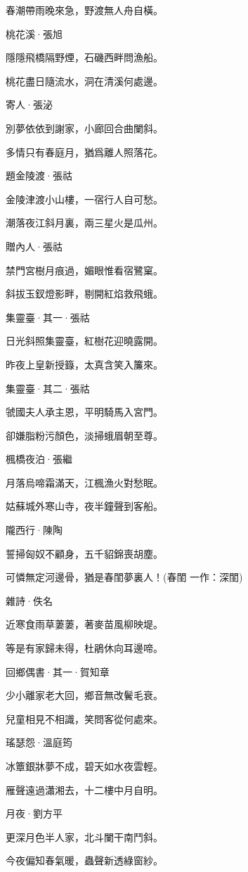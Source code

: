 \documentclass[12pt,a4paper]{ctexbook}
\begin{document}
春潮帶雨晚來急，野渡無人舟自橫。\par
桃花溪·張旭\par
隱隱飛橋隔野煙，石磯西畔問漁船。\par
桃花盡日隨流水，洞在清溪何處邊。\par
寄人·張泌\par
別夢依依到謝家，小廊回合曲闌斜。\par
多情只有春庭月，猶爲離人照落花。\par
題金陵渡·張祜\par
金陵津渡小山樓，一宿行人自可愁。\par
潮落夜江斜月裏，兩三星火是瓜州。\par
贈內人·張祜\par
禁門宮樹月痕過，媚眼惟看宿鷺窠。\par
斜拔玉釵燈影畔，剔開紅焰救飛蛾。\par
集靈臺·其一·張祜\par
日光斜照集靈臺，紅樹花迎曉露開。\par
昨夜上皇新授籙，太真含笑入簾來。\par
集靈臺·其二·張祜\par
虢國夫人承主恩，平明騎馬入宮門。\par
卻嫌脂粉污顏色，淡掃蛾眉朝至尊。\par
楓橋夜泊·張繼\par
月落烏啼霜滿天，江楓漁火對愁眠。\par
姑蘇城外寒山寺，夜半鐘聲到客船。\par
隴西行·陳陶\par
誓掃匈奴不顧身，五千貂錦喪胡塵。\par
可憐無定河邊骨，猶是春閨夢裏人！(春閨 一作：深閨)\par
雜詩·佚名\par
近寒食雨草萋萋，著麥苗風柳映堤。\par
等是有家歸未得，杜鵑休向耳邊啼。\par
回鄉偶書·其一·賀知章\par
少小離家老大回，鄉音無改鬢毛衰。\par
兒童相見不相識，笑問客從何處來。\par
瑤瑟怨·溫庭筠\par
冰簟銀牀夢不成，碧天如水夜雲輕。\par
雁聲遠過瀟湘去，十二樓中月自明。\par
月夜·劉方平\par
更深月色半人家，北斗闌干南鬥斜。\par
今夜偏知春氣暖，蟲聲新透綠窗紗。\par
\end{document}
